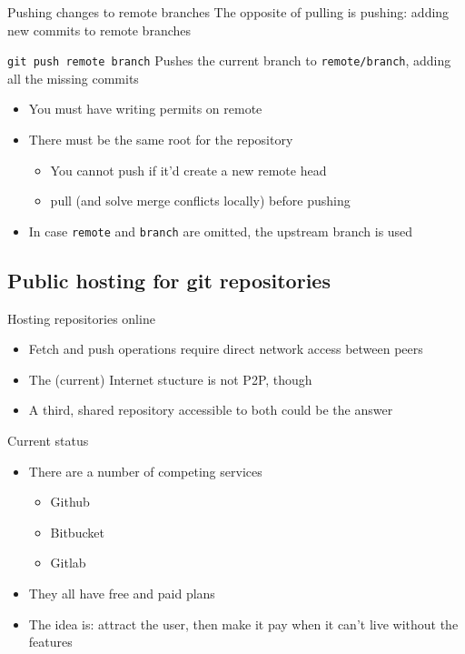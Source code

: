 \documentclass[presentation]{beamer}
\begin{document}
\begin{frame}{Pushing changes to remote branches}
    The opposite of pulling is pushing: adding new commits to remote branches
    \begin{block}{\texttt{git push remote branch}}
        Pushes the current branch to \texttt{remote/branch}, adding all the missing commits
        \begin{itemize}
            \item You must have writing permits on remote
            \item There must be the same root for the repository
            \begin{itemize}
                \item You cannot push if it'd create a new remote head
                \item pull (and solve merge conflicts locally) before pushing
            \end{itemize}
            \item In case \texttt{remote} and \texttt{branch} are omitted, the upstream branch is used
        \end{itemize}
    \end{block}
\end{frame}

\subsection{Public hosting for git repositories}

\begin{frame}{Hosting repositories online}
    \begin{itemize}
        \item Fetch and push operations require direct network access between peers
        \item The (current) Internet stucture is not P2P, though
        \item A third, shared repository accessible to both could be the answer
    \end{itemize}
    \begin{block}{Current status}
        \begin{itemize}
            \item There are a number of competing services
            \begin{itemize}
                \item Github
                \item Bitbucket
                \item Gitlab
            \end{itemize}
            \item They all have free and paid plans
            \item The idea is: attract the user, then make it pay when it can't live without the features
        \end{itemize}
    \end{block}
\end{frame}
\end{document}
